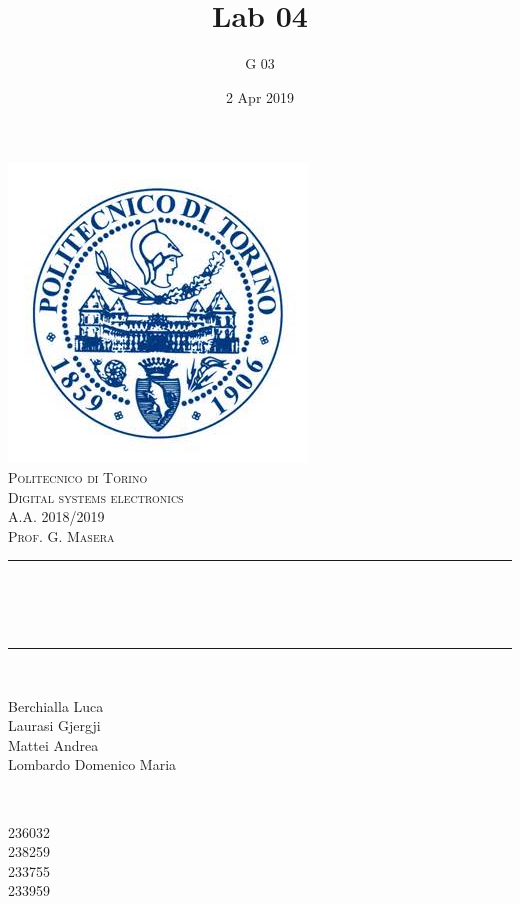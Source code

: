 \documentclass[12pt]{article}
\title{Lab 04}													%
\author{G 03}														%
\date{2 Apr 2019}														%
\makeatletter
\let\thetitle\@title
\let\thedate\@date
\makeatother
\begin{document}

\begin{titlepage}
	\centering
    \vspace*{0.5 cm}
    \includegraphics[scale = 0.75]{polito.jpg}\\[1.0 cm]				%
    \textsc{\LARGE Politecnico di Torino}\\[2.0 cm]						%
	\textsc{\Large Digital systems electronics\\ A.A. 2018/2019}\\[0.5 cm]		%
	\textsc{\Large Prof. G. Masera}\\[0.5 cm]		%
	\rule{\linewidth}{0.2 mm} \\[0.4 cm]
	{ \huge \bfseries \thetitle \\ \small \thedate}\\
	\rule{\linewidth}{0.2 mm} \\[1.5 cm]
	
	\begin{minipage}{0.4\textwidth}
		\begin{flushleft} \large
			Berchialla Luca\\												%
			Laurasi Gjergji
			\\
			
			Mattei Andrea\\
            Lombardo Domenico Maria\\
            
			\end{flushleft}
			\end{minipage}~
			\begin{minipage}{0.4\textwidth}
            
			\begin{flushright} \large
			236032\\													%
			238259\\
            233755\\
            233959\\
            
		\end{flushright}
        
	\end{minipage}\\[2 cm]
	
\end{titlepage}

\end{document}
